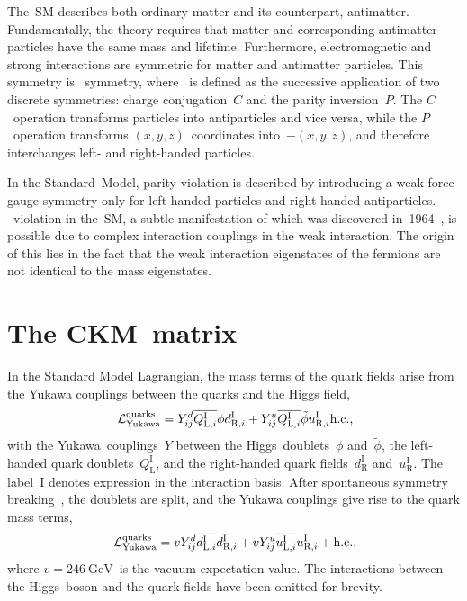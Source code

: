 The~SM describes both ordinary matter and its counterpart, antimatter.
Fundamentally, the theory requires that matter and corresponding antimatter particles have the same mass and lifetime.
Furthermore, electromagnetic and strong interactions are symmetric for matter and antimatter particles.
This symmetry is \CP~symmetry, where \CP~is defined as the successive application of two discrete symmetries: charge conjugation~\(C\) and the parity inversion~\(P\).
The \(C\)~operation transforms particles into antiparticles and vice versa, while the \(P\)~operation transforms \({\left(x, y, z\right)}\)~coordinates into~\({-\left(x, y, z\right)}\), and therefore interchanges left- and right-handed particles.

In the Standard~Model, parity violation is described by introducing a weak force gauge symmetry only for left-handed particles and right-handed antiparticles.
\CP~violation in the~SM, a subtle manifestation of which was discovered in~1964~\cite{CPinKaon}, is possible due to complex interaction couplings in the weak interaction.
The origin of this lies in the fact that the weak interaction eigenstates of the fermions are not identical to the mass eigenstates.

\clearpage
\section{The CKM~matrix}
\label{sec:CKM}

In the Standard Model Lagrangian, the mass terms of the quark fields arise from the Yukawa couplings between the quarks and the Higgs field,
%
\begin{equation}
    \Lagrangian_{\text{Yukawa}}^{\text{quarks}} = Y_{ij}^{d} \overline{Q_{\text{L},i}^{\text{I}}} \phi d_{\text{R},i}^{\text{I}} + Y_{ij}^{u} \overline{Q_{\text{L},i}^{\text{I}}} \tilde{\phi} u_{\text{R},i}^{\text{I}} \text{h.c.} \rlap{,}
\end{equation}
%
with the Yukawa~couplings~\(Y\) between the Higgs~doublets~\(\phi\) and~\(\tilde{\phi}\), the left-handed quark doublets~\(Q_{\text{L}}^{\text{I}}\), and the right-handed quark fields~\(d_{\text{R}}^{\text{I}}\) and~\(u_{\text{R}}^{\text{I}}\).
The label~I denotes expression in the interaction basis.
After spontaneous symmetry breaking~\cite{PhysRevLett.13.321,PhysRevLett.13.508}, the doublets are split, and the Yukawa couplings give rise to the quark mass terms,
%
\begin{equation}
    \Lagrangian_{\text{Yukawa}}^{\text{quarks}} = v Y_{ij}^{d} \overline{d_{\text{L},i}^{\text{I}}} d_{\text{R},i}^{\text{I}} + v Y_{ij}^{u} \overline{u_{\text{L},i}^{\text{I}}} u_{\text{R},i}^{\text{I}} + \text{h.c.} \rlap{,}
\end{equation}
%
where \({v = \SI{246}{\GeV}}\)~is the vacuum expectation value.
The interactions between the Higgs~boson and the quark fields have been omitted for brevity.

